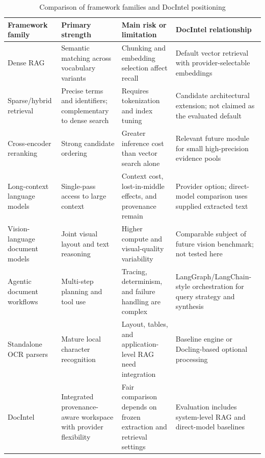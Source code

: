 \documentclass[conference]{IEEEtran}
\begin{document}
\begin{table}[!t]
\centering
\caption{Comparison of framework families and DocIntel positioning}
\label{tab:frameworks}
\small
\setlength{\tabcolsep}{4pt}
\begin{tabular}{p{}p{}p{}p{}}
\toprule
\rowcolor{docintelLightBlue}
Framework family & Primary strength & Main risk or limitation & DocIntel relationship \\
\midrule
Dense RAG & Semantic matching across vocabulary variants & Chunking and embedding selection affect recall & Default vector retrieval with provider-selectable embeddings \\
Sparse/hybrid retrieval & Precise terms and identifiers; complementary to dense search & Requires tokenization and index tuning & Candidate architectural extension; not claimed as the evaluated default \\
Cross-encoder reranking & Strong candidate ordering & Greater inference cost than vector search alone & Relevant future module for small high-precision evidence pools \\
Long-context language models & Single-pass access to large context & Context cost, lost-in-middle effects, and provenance remain & Provider option; direct-model comparison uses supplied extracted text \\
Vision-language document models & Joint visual layout and text reasoning & Higher compute and visual-quality variability & Comparable subject of future vision benchmark; not tested here \\
Agentic document workflows & Multi-step planning and tool use & Tracing, determinism, and failure handling are complex & LangGraph/LangChain-style orchestration for query strategy and synthesis \\
Standalone OCR parsers & Mature local character recognition & Layout, tables, and application-level RAG need integration & Baseline engine or Docling-based optional processing \\
DocIntel & Integrated provenance-aware workspace with provider flexibility & Fair comparison depends on frozen extraction and retrieval settings & Evaluation includes system-level RAG and direct-model baselines \\
\bottomrule
\end{tabular}
\end{table}
\end{document}
